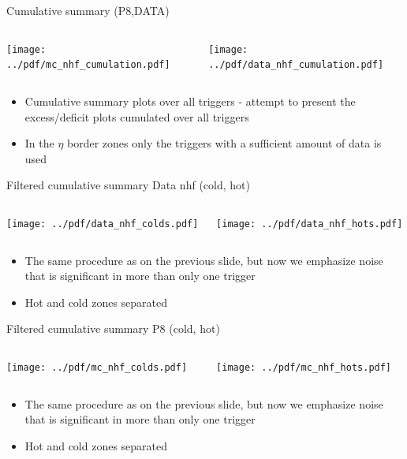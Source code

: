\documentclass[9pt]{beamer}
\begin{document}
\begin{frame}[t]{Cumulative summary (P8,DATA)}
\begin{columns}[T]
  \begin{column}{.5\textwidth}
  \texttt{[image: ../pdf/mc\_nhf\_cumulation.pdf]}
  \end{column}
  \begin{column}{.5\textwidth}
  \texttt{[image: ../pdf/data\_nhf\_cumulation.pdf]}
  \end{column}
\end{columns}
\begin{itemize}
 \item Cumulative summary plots over all triggers - attempt to present the excess/deficit plots cumulated over all triggers
 \item In the $\eta$ border zones only the triggers with a sufficient amount of data is used
\end{itemize}
\end{frame}

\begin{frame}[t]{Filtered cumulative summary Data nhf (cold, hot)}
\begin{columns}[T]
  \begin{column}{.5\textwidth}
  \texttt{[image: ../pdf/data\_nhf\_colds.pdf]}
  \end{column}
  \begin{column}{.5\textwidth}
  \texttt{[image: ../pdf/data\_nhf\_hots.pdf]}
  \end{column}
\end{columns}
\begin{itemize}
 \item The same procedure as on the previous slide, but now we emphasize noise that is significant in more than only one trigger
 \item Hot and cold zones separated
\end{itemize}
\end{frame}

\begin{frame}[t]{Filtered cumulative summary P8 (cold, hot)}
\begin{columns}[T]
  \begin{column}{.5\textwidth}
  \texttt{[image: ../pdf/mc\_nhf\_colds.pdf]}
  \end{column}
  \begin{column}{.5\textwidth}
  \texttt{[image: ../pdf/mc\_nhf\_hots.pdf]}
  \end{column}
\end{columns}
\begin{itemize}
 \item The same procedure as on the previous slide, but now we emphasize noise that is significant in more than only one trigger
 \item Hot and cold zones separated
\end{itemize}
\end{frame}
\end{document}
